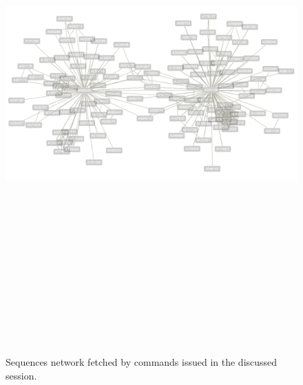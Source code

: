 \newpage
\begin{figure}
\begin{sideways}
\includegraphics[width=20cm, height=20cm]{OEIS/labels}
\caption{Sequences network fetched by commands issued in the discussed session.}
\end{sideways}
\label{fig:oeis:sequences:network}
\end{figure}

